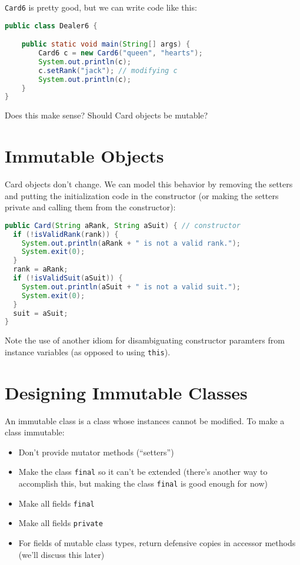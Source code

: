 \documentclass{article}
\begin{document}
{\tt Card6} is pretty good, but we can write code like this:

\begin{lstlisting}[language=Java]
public class Dealer6 {

    public static void main(String[] args) {
        Card6 c = new Card6("queen", "hearts");
        System.out.println(c);
        c.setRank("jack"); // modifying c
        System.out.println(c);
    }
}
\end{lstlisting}
Does this make sense?  Should Card objects be mutable?





\section{Immutable Objects}


Card objects don't change.  We can model this behavior by removing the setters and putting the initialization code in the constructor (or making the setters private and calling them from the constructor):

\begin{lstlisting}[language=Java]
public Card(String aRank, String aSuit) { // constructor
  if (!isValidRank(rank)) {
    System.out.println(aRank + " is not a valid rank.");
    System.exit(0);
  }
  rank = aRank;
  if (!isValidSuit(aSuit)) {
    System.out.println(aSuit + " is not a valid suit.");
    System.exit(0);
  }
  suit = aSuit;
}
\end{lstlisting}

\small Note the use of another idiom for disambiguating constructor paramters from instance variables (as opposed to using {\tt this}).\normalsize





\section{Designing Immutable Classes}


An immutable class is a class whose instances cannot be modified.  To make a class immutable:

\begin{itemize}
\item Don't provide mutator methods (``setters'')
\item Make the class {\tt final} so it can't be extended (there's another way to accomplish this, but making the class {\tt final} is good enough for now)
\item Make all fields {\tt final}
\item Make all fields {\tt private}
\item For fields of mutable class types, return defensive copies in accessor methods (we'll discuss this later)
\end{itemize}
\end{document}
